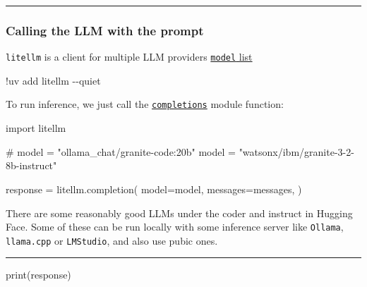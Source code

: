 \documentclass[
  letterpaper,
  DIV=11,
  numbers=noendperiod]{scrartcl}
\newenvironment{Shaded}{\begin{snugshade}}{\end{snugshade}}
\newcommand{\BuiltInTok}[1]{\textcolor[rgb]{0.00,0.23,0.31}{#1}}
\newcommand{\CommentTok}[1]{\textcolor[rgb]{0.37,0.37,0.37}{#1}}
\newcommand{\ImportTok}[1]{\textcolor[rgb]{0.00,0.46,0.62}{#1}}
\newcommand{\NormalTok}[1]{\textcolor[rgb]{0.00,0.23,0.31}{#1}}
\newcommand{\OperatorTok}[1]{\textcolor[rgb]{0.37,0.37,0.37}{#1}}
\newcommand{\StringTok}[1]{\textcolor[rgb]{0.13,0.47,0.30}{#1}}
\begin{document}
\begin{center}\rule{0.5\linewidth}{0.5pt}\end{center}

\subsubsection{Calling the LLM with the
prompt}\label{calling-the-llm-with-the-prompt}

\texttt{litellm} is a client for multiple LLM providers
\href{https://docs.litellm.ai/docs/providers}{ \texttt{model} list}

\begin{Shaded}
\begin{Highlighting}[]
\OperatorTok{!}\NormalTok{uv add litellm }\OperatorTok{{-}{-}}\NormalTok{quiet}
\end{Highlighting}
\end{Shaded}

To run inference, we just call the
\href{https://docs.litellm.ai/docs/completion/input}{\texttt{completions}}
module function:

\begin{Shaded}
\begin{Highlighting}[]
\ImportTok{import}\NormalTok{ litellm}

\CommentTok{\# model = "ollama\_chat/granite{-}code:20b"}
\NormalTok{model }\OperatorTok{=} \StringTok{"watsonx/ibm/granite{-}3{-}2{-}8b{-}instruct"}

\NormalTok{response }\OperatorTok{=}\NormalTok{ litellm.completion(}
\NormalTok{  model}\OperatorTok{=}\NormalTok{model,}
\NormalTok{  messages}\OperatorTok{=}\NormalTok{messages,}
\NormalTok{)}
\end{Highlighting}
\end{Shaded}

There are some reasonably good LLMs under the coder and instruct in
Hugging Face. Some of these can be run locally with some inference
server like \texttt{Ollama}, \texttt{llama.cpp} or \texttt{LMStudio},
and also use pubic ones.

\begin{center}\rule{0.5\linewidth}{0.5pt}\end{center}

\begin{Shaded}
\begin{Highlighting}[]
\BuiltInTok{print}\NormalTok{(response)}
\end{Highlighting}
\end{Shaded}
\end{document}
